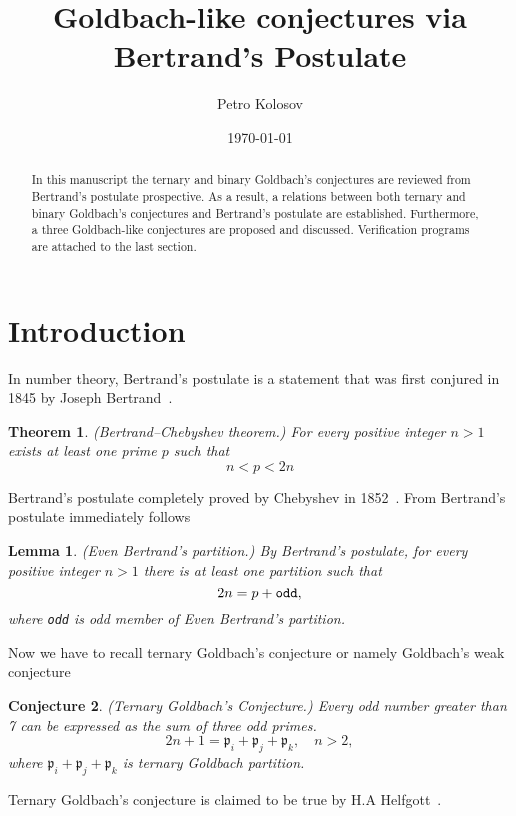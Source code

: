 \documentclass[12pt,letterpaper,oneside,reqno]{amsart}
\title[Goldbach-like conjectures via Bertrand's Postulate]{Goldbach-like conjectures via Bertrand's Postulate}
\author[Petro Kolosov]{Petro Kolosov}
\date{\today}
\newtheorem{thm}{Theorem}[section]
\newtheorem{lem}{Lemma}[section]
\newtheorem{conj}[thm]{Conjecture}
\begin{document}
    \begin{abstract}
        In this manuscript the ternary and binary Goldbach's conjectures are reviewed from Bertrand's postulate prospective.
        As a result, a relations between both ternary and binary Goldbach's conjectures and Bertrand's postulate
        are established.
        Furthermore, a three Goldbach-like conjectures are proposed and discussed.
        Verification programs are attached to the last section.
    \end{abstract}
    \maketitle
    \tableofcontents


    \section{Introduction} \label{sec:introduction}
    In number theory, Bertrand's postulate is a statement that was first conjured in 1845 by
    Joseph Bertrand~\cite{bertrand1845}.
    \begin{thm}
        \label{bertrand_theorem} (Bertrand–Chebyshev theorem.)
        For every positive integer $n>1$ exists at least one prime $p$ such that
        \[
            n < p < 2n
        \]
    \end{thm}
    Bertrand's postulate completely proved by Chebyshev in 1852~\cite{Tchebichef1852}.
    From Bertrand's postulate immediately follows
    \begin{lem}
        \label{bertrands_partition_lemma} (Even Bertrand's partition.)
        By Bertrand's postulate, for every positive integer $n>1$ there is at least one partition such that
        \[
            2n = p + \verb!odd!,
        \]
        where \verb!odd! is odd member of Even Bertrand's partition.
    \end{lem}
    Now we have to recall ternary Goldbach's conjecture or namely Goldbach's weak conjecture
    \begin{conj}
        \label{ternary_goldbach_conjecture} (Ternary Goldbach's Conjecture.)
        Every odd number greater than 7 can be expressed as the sum of three odd primes.
        \[
            2n+1 = \mathfrak{p}_i +  \mathfrak{p}_j + \mathfrak{p}_k, \quad n > 2,
        \]
        where $\mathfrak{p}_i +  \mathfrak{p}_j + \mathfrak{p}_k$ is ternary Goldbach partition.
    \end{conj}
    Ternary Goldbach's conjecture is claimed to be true by H.A Helfgott~\cite{helfgott2013minor, helfgott2014ternary}.
\end{document}
